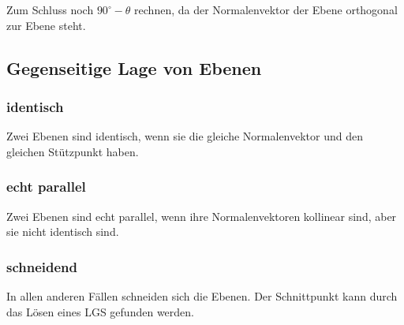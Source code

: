\documentclass{article}
\begin{document}
\begin{minipage}[t]{0.45\textwidth}
    Zum Schluss noch $ 90^\circ - \theta$ rechnen, da der Normalenvektor der Ebene orthogonal zur Ebene steht.
    \subsection*{Gegenseitige Lage von Ebenen}
    \subsubsection*{identisch}
    Zwei Ebenen sind identisch, wenn sie die gleiche Normalenvektor und den gleichen Stützpunkt haben.

    \subsubsection*{echt parallel}
    Zwei Ebenen sind echt parallel, wenn ihre Normalenvektoren kollinear sind, aber sie nicht identisch sind.
    
    \subsubsection*{schneidend}
    In allen anderen Fällen schneiden sich die Ebenen. Der Schnittpunkt kann durch das Lösen eines LGS gefunden werden.
\end{minipage}
\end{document}
